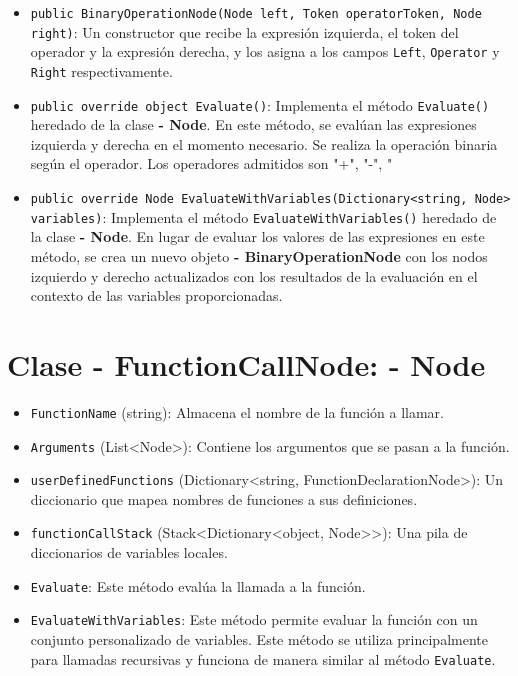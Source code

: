 \documentclass{article}
\newcommand{\subclassed}[1]{\textcolor{classcolor}{\textbf{- #1}}}
\begin{document}
\begin{itemize}
    \item \lstinline{public BinaryOperationNode(Node left, Token operatorToken, Node right)}: Un constructor que recibe la expresión izquierda, el token del operador y la expresión derecha, y los asigna a los campos \lstinline{Left}, \lstinline{Operator} y \lstinline{Right} respectivamente.

    \item \lstinline{public override object Evaluate()}: Implementa el método \lstinline{Evaluate()} heredado de la clase \subclassed{Node}. En este método, se evalúan las expresiones izquierda y derecha en el momento necesario. Se realiza la operación binaria según el operador. Los operadores admitidos son "+", "-", "%

    \item \lstinline{public override Node EvaluateWithVariables(Dictionary<string, Node> variables)}: Implementa el método \lstinline{EvaluateWithVariables()} heredado de la clase \subclassed{Node}. En lugar de evaluar los valores de las expresiones en este método, se crea un nuevo objeto \subclassed{BinaryOperationNode} con los nodos izquierdo y derecho actualizados con los resultados de la evaluación en el contexto de las variables proporcionadas.

\end{itemize}
\section{Clase \subclassed{FunctionCallNode}: \subclassed{Node}}

\begin{itemize}
        \item \lstinline{FunctionName} (string): Almacena el nombre de la función a llamar.
        \item \lstinline{Arguments} (List<Node>): Contiene los argumentos que se pasan a la función.
        \item \lstinline{userDefinedFunctions} (Dictionary<string, FunctionDeclarationNode>): Un diccionario que mapea nombres de funciones a sus definiciones.
        \item \lstinline{functionCallStack} (Stack<Dictionary<object, Node>>): Una pila de diccionarios de variables locales.
        \item \lstinline{Evaluate}: Este método evalúa la llamada a la función.
        \item \lstinline{EvaluateWithVariables}: Este método permite evaluar la función con un conjunto personalizado de variables. Este método se utiliza principalmente para llamadas recursivas y funciona de manera similar al método \texttt{Evaluate}.
    
\end{itemize}
\end{document}
